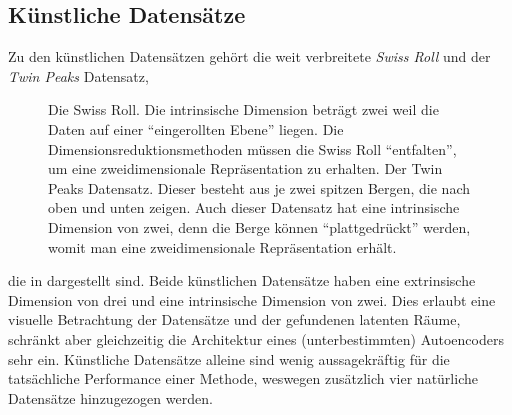 \subsection{Künstliche Datensätze}
\label{ch:Vergleich:sec:VerwendeteDatensaetze:kuenstlich}
Zu den künstlichen Datensätzen gehört die weit
verbreitete \textit{Swiss Roll} und der \textit{Twin Peaks} Datensatz,
\begin{figure}[ht]
	\label{fig:ArtificialDatasets}
	\begin{center}
		
	\end{center}
	\caption[Künstliche Datensätze]{\figleft Die Swiss Roll. Die intrinsische Dimension beträgt zwei weil die Daten auf einer \enquote{eingerollten Ebene} liegen. Die Dimensionsreduktionsmethoden müssen die Swiss Roll \enquote{entfalten}, um eine zweidimensionale Repräsentation zu erhalten. \figright Der Twin Peaks Datensatz. Dieser besteht aus je zwei spitzen Bergen, die nach oben und unten zeigen. Auch dieser Datensatz hat eine intrinsische Dimension von zwei, denn die Berge können \enquote{plattgedrückt} werden, womit man eine zweidimensionale Repräsentation erhält.}
\end{figure}
die in  dargestellt sind.
Beide künstlichen Datensätze haben eine extrinsische Dimension von drei und eine intrinsische
Dimension von zwei. Dies erlaubt eine visuelle Betrachtung der Datensätze und der gefundenen
latenten Räume, schränkt aber gleichzeitig die Architektur eines (unterbestimmten) Autoencoders
sehr ein. Künstliche Datensätze alleine sind wenig aussagekräftig für die tatsächliche Performance
einer Methode, weswegen zusätzlich vier natürliche Datensätze hinzugezogen werden.

